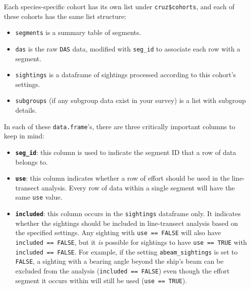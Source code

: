 \documentclass[
]{book}
\newenvironment{Shaded}{\begin{snugshade}}{\end{snugshade}}
\newcommand{\AttributeTok}[1]{\textcolor[rgb]{0.13,0.29,0.53}{#1}}
\newcommand{\DecValTok}[1]{\textcolor[rgb]{0.00,0.00,0.81}{#1}}
\newcommand{\FloatTok}[1]{\textcolor[rgb]{0.00,0.00,0.81}{#1}}
\newcommand{\FunctionTok}[1]{\textcolor[rgb]{0.13,0.29,0.53}{\textbf{#1}}}
\newcommand{\NormalTok}[1]{#1}
\newcommand{\SpecialCharTok}[1]{\textcolor[rgb]{0.81,0.36,0.00}{\textbf{#1}}}
\begin{document}
\begin{Shaded}
\end{Shaded}

Each species-specific cohort has its own list under \texttt{cruz\$cohorts}, and each of these cohorts has the same list structure:

\begin{itemize}
\item
  \texttt{segments} is a summary table of segments.
\item
  \texttt{das} is the raw \texttt{DAS} data, modified with \texttt{seg\_id} to associate each row with a segment.
\item
  \texttt{sightings} is a dataframe of sightings processed according to this cohort's settings.
\item
  \texttt{subgroups} (if any subgroup data exist in your survey) is a list with subgroup details.
\end{itemize}

In each of these \texttt{data.frame}'s, there are three critically important columns to keep in mind:

\begin{itemize}
\item
  \textbf{\texttt{seg\_id}}: this column is used to indicate the segment ID that a row of data belongs to.
\item
  \textbf{\texttt{use}}: this column indicates whether a row of effort should be used in the line-transect analysis. Every row of data within a single segment will have the same \texttt{use} value.
\item
  \textbf{\texttt{included}}: this column occurs in the \texttt{sightings} dataframe only. It indicates whether the sightings should be included in line-transect analysis based on the specified settings. Any sighting with \texttt{use\ ==\ FALSE} will also have \texttt{included\ ==\ FALSE}, but it \emph{is} possible for sightings to have \texttt{use\ ==\ TRUE} with \texttt{included\ ==\ FALSE}. For example, if the setting \texttt{abeam\_sightings} is set to \texttt{FALSE}, a sighting with a bearing angle beyond the ship's beam can be excluded from the analysis (\texttt{included\ ==\ FALSE}) even though the effort segment it occurs within will still be used (\texttt{use\ ==\ TRUE}).
\end{itemize}
\end{document}
